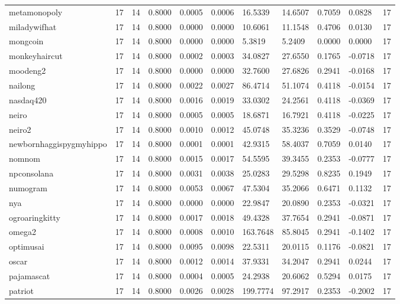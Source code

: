 \begin{table}[htbp]
\begin{tabular}{lllllllllll}
metamonopoly & 17 & 14 & 0.8000 & 0.0005 & 0.0006 & 16.5339 & 14.6507 & 0.7059 & 0.0828 & 17 \\
miladywifhat & 17 & 14 & 0.8000 & 0.0000 & 0.0000 & 10.6061 & 11.1548 & 0.4706 & 0.0130 & 17 \\
mongcoin & 17 & 14 & 0.8000 & 0.0000 & 0.0000 & 5.3819 & 5.2409 & 0.0000 & 0.0000 & 17 \\
monkeyhaircut & 17 & 14 & 0.8000 & 0.0002 & 0.0003 & 34.0827 & 27.6550 & 0.1765 & -0.0718 & 17 \\
moodeng2 & 17 & 14 & 0.8000 & 0.0000 & 0.0000 & 32.7600 & 27.6826 & 0.2941 & -0.0168 & 17 \\
nailong & 17 & 14 & 0.8000 & 0.0022 & 0.0027 & 86.4714 & 51.1074 & 0.4118 & -0.0154 & 17 \\
nasdaq420 & 17 & 14 & 0.8000 & 0.0016 & 0.0019 & 33.0302 & 24.2561 & 0.4118 & -0.0369 & 17 \\
neiro & 17 & 14 & 0.8000 & 0.0005 & 0.0005 & 18.6871 & 16.7921 & 0.4118 & -0.0225 & 17 \\
neiro2 & 17 & 14 & 0.8000 & 0.0010 & 0.0012 & 45.0748 & 35.3236 & 0.3529 & -0.0748 & 17 \\
newbornhaggispygmyhippo & 17 & 14 & 0.8000 & 0.0001 & 0.0001 & 42.9315 & 58.4037 & 0.7059 & 0.0140 & 17 \\
nomnom & 17 & 14 & 0.8000 & 0.0015 & 0.0017 & 54.5595 & 39.3455 & 0.2353 & -0.0777 & 17 \\
npconsolana & 17 & 14 & 0.8000 & 0.0031 & 0.0038 & 25.0283 & 29.5298 & 0.8235 & 0.1949 & 17 \\
numogram & 17 & 14 & 0.8000 & 0.0053 & 0.0067 & 47.5304 & 35.2066 & 0.6471 & 0.1132 & 17 \\
nya & 17 & 14 & 0.8000 & 0.0000 & 0.0000 & 22.9847 & 20.0890 & 0.2353 & -0.0321 & 17 \\
ogroaringkitty & 17 & 14 & 0.8000 & 0.0017 & 0.0018 & 49.4328 & 37.7654 & 0.2941 & -0.0871 & 17 \\
omega2 & 17 & 14 & 0.8000 & 0.0008 & 0.0010 & 163.7648 & 85.8045 & 0.2941 & -0.1402 & 17 \\
optimusai & 17 & 14 & 0.8000 & 0.0095 & 0.0098 & 22.5311 & 20.0115 & 0.1176 & -0.0821 & 17 \\
oscar & 17 & 14 & 0.8000 & 0.0012 & 0.0014 & 37.9331 & 34.2047 & 0.2941 & 0.0244 & 17 \\
pajamascat & 17 & 14 & 0.8000 & 0.0004 & 0.0005 & 24.2938 & 20.6062 & 0.5294 & 0.0175 & 17 \\
patriot & 17 & 14 & 0.8000 & 0.0026 & 0.0028 & 199.7774 & 97.2917 & 0.2353 & -0.2002 & 17 \\

\end{tabular}
\end{table}
